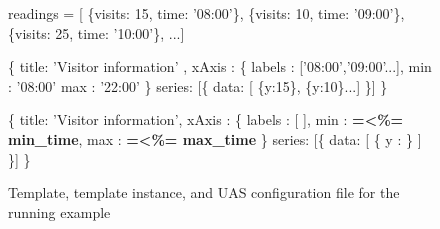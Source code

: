 \begin{figure*}
\begin{minipage}[c]{6cm}
\begin{minipage}[c]{6cm}
\begin{code}
readings = [
   \{visits: 15, time: '08:00'\}, 
   \{visits: 10, time: '09:00'\},
   \{visits: 25, time: '10:00'\},  ...]
\end{code}
\vspace*{-0.3cm}
\label{figure:running-example:query-result}
\vspace*{0.3cm}
\end{minipage}
%
\end{minipage}
\hspace{1cm}
\begin{minipage}[c]{6cm}
\begin{minipage}[c]{8.5cm}
\begin{code}
   \{
    title: 'Visitor information' ,
    xAxis : \{ 
      labels : ['08:00','09:00'...],
      min : '08:00'
      max : '22:00'
    \}
    series: [\{ data: [ \{y:15\}, \{y:10\}...] \}]
  \} 
\end{code}
\vspace*{-0.3cm}
\vspace*{0.3cm}
\label{figure:running-example:unit-body}
\end{minipage}
\begin{minipage}[c]{8.5cm}
\begin{code}
  \{
    title: 'Visitor information',
    xAxis : \{ 
      labels : [
        ],
      min : \textbf{=<\%= min_time},
      max : \textbf{=<\%= max_time}
    \}
    series: [\{
      data: [ 
          \{
            y  : 
          \}
         ]
    \}]
  \}
\end{code}
\vspace*{-0.3cm}
\vspace*{0.3cm}
\label{figure:running-example:main-template}
\end{minipage}
\end{minipage}

\caption{Template, template instance, and UAS configuration file for the running example}

\end{figure*}



